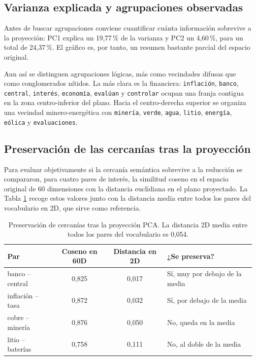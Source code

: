 \documentclass[12pt, a4paper]{article}
\newcommand{\code}[1]{\texttt{#1}}
\begin{document}
\subsection{Varianza explicada y agrupaciones observadas}

Antes de buscar agrupaciones conviene cuantificar cuánta información sobrevive a la proyección: PC1
explica un 19,77\,\% de la varianza y PC2 un 4,60\,\%, para un total de 24,37\,\%. El gráfico es, por
tanto, un resumen bastante parcial del espacio original.

Aun así se distinguen agrupaciones lógicas, más como vecindades difusas que como conglomerados
nítidos. La más clara es la financiera: \code{inflación}, \code{banco}, \code{central},
\code{interés}, \code{economía}, \code{evalúan} y \code{controlar} ocupan una franja contigua en la
zona centro-inferior del plano. Hacia el centro-derecha superior se organiza una vecindad
minero-energética con \code{minería}, \code{verde}, \code{agua}, \code{litio}, \code{energía},
\code{eólica} y \code{evaluaciones}.

\subsection{Preservación de las cercanías tras la proyección}

Para evaluar objetivamente si la cercanía semántica sobrevive a la reducción se compararon, para
cuatro pares de interés, la similitud coseno en el espacio original de 60 dimensiones con la
distancia euclidiana en el plano proyectado. La Tabla \ref{tab:pca} recoge estos valores junto con la
distancia media entre todos los pares del vocabulario en 2D, que sirve como referencia.

\begin{table}[H]
\centering
\caption{Preservación de cercanías tras la proyección PCA. La distancia 2D media entre todos los
pares del vocabulario es 0,054.}
\label{tab:pca}
\small
\renewcommand{\arraystretch}{1.2}
\begin{tabular}{@{}lccl@{}}
\toprule
\textbf{Par} & \textbf{Coseno en 60D} & \textbf{Distancia en 2D} & \textbf{¿Se preserva?} \\
\midrule
banco -- central     & 0,825 & 0,017 & Sí, muy por debajo de la media \\
inflación -- tasa    & 0,872 & 0,032 & Sí, por debajo de la media \\
cobre -- minería     & 0,876 & 0,050 & No, queda en la media \\
litio -- baterías    & 0,758 & 0,111 & No, al doble de la media \\
\bottomrule
\end{tabular}
\end{table}
\end{document}
